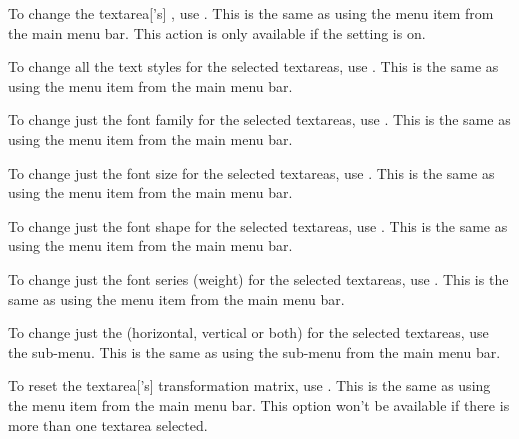
To change the \gls{textarea}['s] , use
. This is the same as using the
 menu item from the main menu bar.
This action is only available if the  setting is on.


To change all the text styles for the selected \glspl{textarea},
use . This is the same as using the
 menu item from the main menu bar.


To change just the font family for the selected \glspl{textarea},
use . This is the same as using the
 menu item from the main menu bar.


To change just the font size for the selected \glspl{textarea},
use . This is the same as using the
 menu item from the main menu bar.


To change just the font shape for the selected \glspl{textarea},
use . This is the same as using the
 menu item from the main menu bar.


To change just the font series (weight) for the selected \glspl{textarea},
use . This is the same as using the
 menu item from the main menu bar.


To change just the  (horizontal, vertical or both) for the
selected \glspl{textarea}, use the 
sub-menu. This is the same as using the
 sub-menu from the main menu
bar.


To reset the \gls{textarea}['s] transformation matrix, use 
. This is the same as using the 
 menu item from the main menu bar.
This option won't be available if there is more than one
\gls{textarea} selected.

